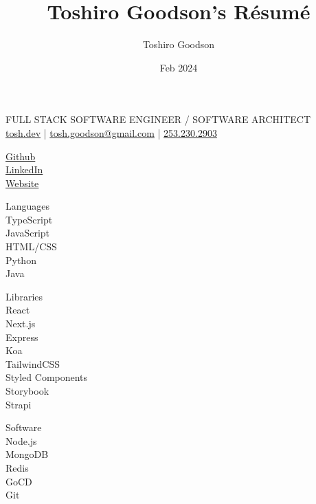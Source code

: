 \documentclass{resume}
\title{Toshiro Goodson's Résumé}
\author{Toshiro Goodson}
\date{Feb 2024}
\begin{document}
\color{content}
\begin{spacing}{1.2}
	\begin{paracol}{2}
		\switchcolumn
		\color{subcontent}
		\begin{spacing}{0.9}
			{\Huge {}}
		\end{spacing}
		FULL STACK SOFTWARE ENGINEER / SOFTWARE ARCHITECT\\
		\href{https://tosh.dev}{tosh.dev} | \href{mailto:tosh.goodson@gmail.com}{tosh.goodson@gmail.com} | \href{tel:2532302903}{253.230.2903}
	\end{paracol}

	\bigskip
	\bigskip
	\bigskip

	\begin{paracol}{2}
		\begin{flushright}
			\small {}

			\href{https://github.com/toshgoodson/}{Github}\\
			\href{https://www.linkedin.com/in/toshgoodson/}{LinkedIn}\\
			\href{https://tosh.dev}{Website}

			\bigskip

			\small {}

			{\color{subcontent} \footnotesize Languages}\\
			\smallskip
			TypeScript\\
			JavaScript\\
			HTML/CSS\\
			Python\\
			Java

			\medskip

			{\color{subcontent} \footnotesize Libraries}\\
			\smallskip
			React\\
			Next.js\\
			Express\\
			Koa\\
			TailwindCSS\\
			Styled Components\\
			Storybook\\
			Strapi

			\medskip

			{\color{subcontent} \footnotesize Software}\\
			\smallskip
			Node.js\\
			MongoDB\\
			Redis\\
			GoCD\\
			Git
		\end{flushright}


\end{paracol}
\end{spacing}
\end{document}

